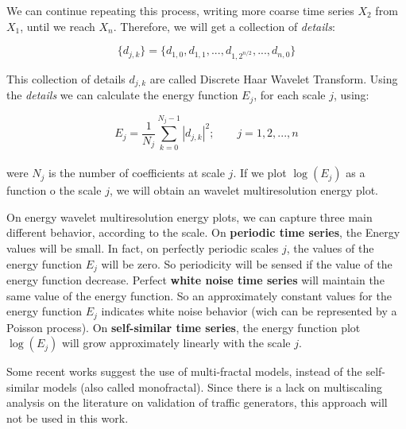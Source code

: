 We can continue repeating this process, writing more coarse time series $X_{2}$ from $X_{1}$, until we reach $X_{n}$. Therefore, we will get a collection of \textit{details}:

\begin{equation}
\{d_{j,k}\} = \{ d_{1,0}, d_{1,1}, ..., d_{1,2^{n/2}}, ..., d_{n, 0} \}
\end{equation} 


This collection of details ${d_{j,k}}$ are called Discrete Haar Wavelet Transform. Using the \textit{details} we can calculate the energy function $E_{j}$, for each scale $j$, using:

\begin{equation}
E_{j} = \frac{1}{N_{j}} \sum_{k = 0}^{N_{j} - 1} |d_{j,k}|^{2}; \qquad j = 1, 2, ..., n
\end{equation} 
\\ 
were $N_{j}$ is the number of coefficients at scale $j$. If we plot $\log(E_{j})$ as a function o the scale $j$, we will obtain an wavelet multiresolution energy plot. 

On energy wavelet multiresolution energy plots, we can capture three main different behavior, according to the scale.  On \textbf{periodic time series}, the Energy values will be small. In fact, on perfectly periodic scales $j$, the values of the energy function $E_{j}$ will be zero. So periodicity will be sensed if the value of the energy function decrease. Perfect \textbf{white noise time series} will maintain the same value of the energy function. So an approximately constant values for the energy function $E_{j}$ indicates white noise behavior (wich can be represented by a Poisson process\cite{poisson-white-noise}). On \textbf{self-similar time series}, the energy function plot $\log(E_{j})$ will grow approximately linearly with the scale $j$.  

Some recent works suggest the use of multi-fractal models, instead of the self-similar models (also called monofractal)\cite{validate-trafficgen}\cite{udp-flows-model}. Since there is a lack  on multiscaling analysis on the literature on validation of traffic generators, this approach will not be used in this work. 

